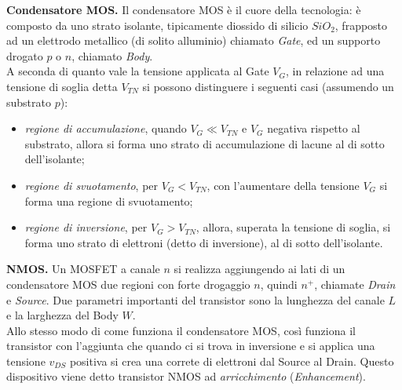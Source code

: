 \documentclass[a4paper,portrait,12pt]{article}
\theoremstyle{definition}
\begin{document}
\textbf{Condensatore MOS.} Il condensatore MOS è il cuore della tecnologia: è composto da uno strato isolante,
tipicamente diossido di silicio $SiO_2$, frapposto ad un elettrodo metallico (di solito alluminio) chiamato
\textit{Gate}, ed un supporto drogato $p$ o $n$, chiamato \textit{Body}.\\
A seconda di quanto vale la tensione applicata al Gate $V_G$, in relazione ad una tensione di soglia detta
$V_{TN}$ si possono distinguere i seguenti casi (assumendo un substrato $p$):
\begin{itemize}
\item \textit{regione di accumulazione}, quando $V_G \ll V_{TN}$ e $V_G$ negativa rispetto al substrato, 
	allora si forma uno strato di accumulazione di lacune al di sotto dell'isolante;
\item \textit{regione di svuotamento}, per $V_G < V_{TN}$, con l'aumentare della tensione $V_G$ si forma
	una regione di svuotamento;
\item \textit{regione di inversione}, per $V_G > V_{TN}$, allora, superata la tensione di soglia, si forma 
	uno strato di elettroni (detto di inversione), al di sotto dell'isolante.
\end{itemize} 
\bigskip

\textbf{NMOS.} Un MOSFET a canale $n$ si realizza aggiungendo ai lati di un condensatore MOS due regioni con 
forte drogaggio $n$, quindi $n^+$, chiamate \textit{Drain} e \textit{Source}. Due parametri importanti del 
transistor sono la lunghezza del canale $L$ e la larghezza del Body $W$.\\
Allo stesso modo di come funziona il condensatore MOS, così funziona il transistor con l'aggiunta che quando
ci si trova in inversione e si applica una tensione $v_{DS}$ positiva si crea una correte di elettroni dal
Source al Drain. Questo dispositivo viene detto transistor NMOS ad \textit{arricchimento} 
(\textit{Enhancement}).    
\bigskip
\end{document}
